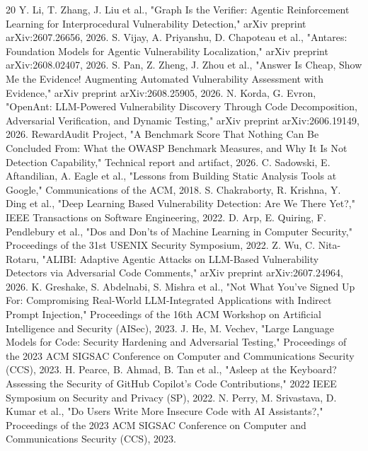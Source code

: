 \documentclass[conference]{IEEEtran}
\begin{document}
\begin{thebibliography}{20}
\scriptsize
\setlength{\itemsep}{0pt}\setlength{\parsep}{0pt}
 Y. Li, T. Zhang, J. Liu et al., "Graph Is the Verifier: Agentic Reinforcement Learning for Interprocedural Vulnerability Detection," arXiv preprint arXiv:2607.26656, 2026.
 S. Vijay, A. Priyanshu, D. Chapoteau et al., "Antares: Foundation Models for Agentic Vulnerability Localization," arXiv preprint arXiv:2608.02407, 2026.
 S. Pan, Z. Zheng, J. Zhou et al., "Answer Is Cheap, Show Me the Evidence! Augmenting Automated Vulnerability Assessment with Evidence," arXiv preprint arXiv:2608.25905, 2026.
 N. Korda, G. Evron, "OpenAnt: LLM-Powered Vulnerability Discovery Through Code Decomposition, Adversarial Verification, and Dynamic Testing," arXiv preprint arXiv:2606.19149, 2026.
 RewardAudit Project, "A Benchmark Score That Nothing Can Be Concluded From: What the OWASP Benchmark Measures, and Why It Is Not Detection Capability," Technical report and artifact, 2026.
 C. Sadowski, E. Aftandilian, A. Eagle et al., "Lessons from Building Static Analysis Tools at Google," Communications of the ACM, 2018.
 S. Chakraborty, R. Krishna, Y. Ding et al., "Deep Learning Based Vulnerability Detection: Are We There Yet?," IEEE Transactions on Software Engineering, 2022.
 D. Arp, E. Quiring, F. Pendlebury et al., "Dos and Don'ts of Machine Learning in Computer Security," Proceedings of the 31st USENIX Security Symposium, 2022.
 Z. Wu, C. Nita-Rotaru, "ALIBI: Adaptive Agentic Attacks on LLM-Based Vulnerability Detectors via Adversarial Code Comments," arXiv preprint arXiv:2607.24964, 2026.
 K. Greshake, S. Abdelnabi, S. Mishra et al., "Not What You've Signed Up For: Compromising Real-World LLM-Integrated Applications with Indirect Prompt Injection," Proceedings of the 16th ACM Workshop on Artificial Intelligence and Security (AISec), 2023.
 J. He, M. Vechev, "Large Language Models for Code: Security Hardening and Adversarial Testing," Proceedings of the 2023 ACM SIGSAC Conference on Computer and Communications Security (CCS), 2023.
 H. Pearce, B. Ahmad, B. Tan et al., "Asleep at the Keyboard? Assessing the Security of GitHub Copilot's Code Contributions," 2022 IEEE Symposium on Security and Privacy (SP), 2022.
 N. Perry, M. Srivastava, D. Kumar et al., "Do Users Write More Insecure Code with AI Assistants?," Proceedings of the 2023 ACM SIGSAC Conference on Computer and Communications Security (CCS), 2023.

\end{thebibliography}
\end{document}
